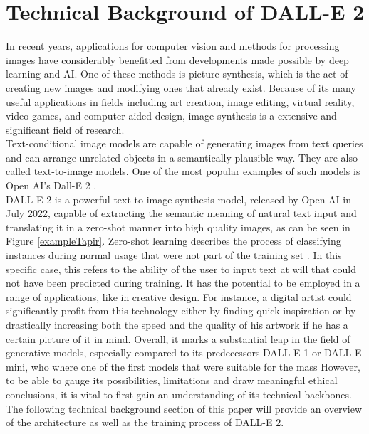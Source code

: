 \documentclass[10pt,twocolumn,twoside]{osajnl}
\begin{document}
\section{Technical Background of DALL-E 2}
In recent years, applications for computer vision and methods for processing images have considerably benefitted from developments made possible by deep learning and AI. 
One of these methods is picture synthesis, which is the act of creating new images and modifying ones that already exist. 
Because of its many useful applications in fields including art creation, image editing, virtual reality, video games, and computer-aided design, image synthesis is a extensive and significant field of research.\\
Text-conditional image models are capable of generating images from text queries and can arrange unrelated objects in a semantically plausible way. They are also called text-to-image models.
One of the most popular examples of such models is Open AI's Dall-E 2 \cite{DallE}.\\ 
DALL-E 2 is a powerful text-to-image synthesis model, released by Open AI in July 2022, capable of extracting the semantic meaning of natural text input and translating it in a zero-shot manner \cite{zeroShot} into high quality images, as can be seen in Figure \ref{exampleTapir}.
Zero-shot learning describes the process of classifying instances during normal usage that were not part of the training set \cite{mfdp}.
In this specific case, this refers to the ability of the user to input text at will that could not have been predicted during training.
It has the potential to be employed in a range of applications, like in creative design. For instance, a digital artist could significantly profit from this technology either by 
finding quick inspiration or by drastically increasing both the speed and the quality of his artwork if he has a certain picture of it in mind.
Overall, it marks a substantial leap in the field of generative models, especially compared to its predecessors DALL-E 1 or DALL-E mini, who where one of the first models that were suitable for the mass\cite{}%
However, to be able to gauge its possibilities, limitations and draw meaningful ethical conclusions, it is vital to first gain an understanding of its technical backbones.
The following technical background section of this paper will provide an overview of the architecture as well as the training process of DALL-E 2. 
\end{document}
